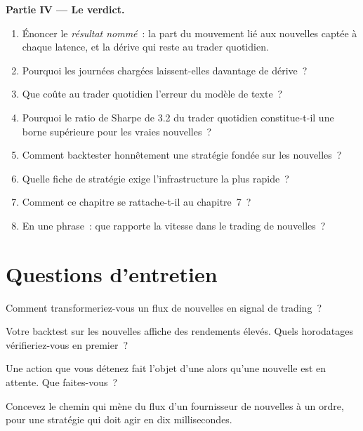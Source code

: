 \begin{problem}
\medskip\noindent\textbf{Partie IV --- Le verdict.}
\begin{enumerate}[resume]
\item Énoncer le \emph{résultat nommé}~: la part du mouvement lié aux nouvelles captée à chaque latence, et la dérive qui reste au trader quotidien.
\item Pourquoi les journées chargées laissent-elles davantage de dérive~?
\item Que coûte au trader quotidien l'erreur du modèle de texte~?
\item Pourquoi le ratio de Sharpe de 3.2 du trader quotidien constitue-t-il une borne supérieure pour les vraies nouvelles~?
\item Comment backtester honnêtement une stratégie fondée sur les nouvelles~?
\item Quelle fiche de stratégie exige l'infrastructure la plus rapide~?
\item Comment ce chapitre se rattache-t-il au chapitre~7~?
\item En une phrase~: que rapporte la vitesse dans le trading de nouvelles~?
\end{enumerate}
\end{problem}

\section{Questions d'entretien}

\begin{interviewq}\label{iq:s1:news-and-events:1}
Comment transformeriez-vous un flux de nouvelles en signal de trading~?
\end{interviewq}

\begin{interviewq}\label{iq:s1:news-and-events:2}
Votre backtest sur les nouvelles affiche des rendements élevés. Quels horodatages vérifieriez-vous en premier~?
\end{interviewq}

\begin{interviewq}\label{iq:s1:news-and-events:3}
Une action que vous détenez fait l'objet d'une  alors qu'une nouvelle est en attente. Que faites-vous~?
\end{interviewq}

\begin{interviewq}\label{iq:s1:news-and-events:4}
Concevez le chemin qui mène du flux d'un fournisseur de nouvelles à un ordre, pour une stratégie qui doit agir en dix millisecondes.
\end{interviewq}

